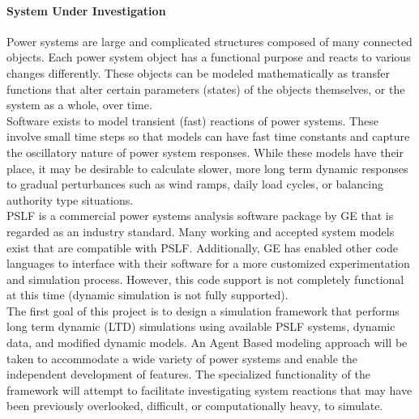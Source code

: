 \documentclass[12pt]{article}
\begin{document}
\paragraph{System Under Investigation}
Power systems are large and complicated structures composed of many connected objects. Each power system object has a functional purpose and reacts to various changes differently. These objects can be modeled mathematically as transfer functions that alter certain parameters (states) of the objects themselves, or the system as a whole, over time. \\

Software exists to model transient (fast) reactions of power systems. These involve small time steps so that models can have fast time constants and capture the oscillatory nature of power system responses. While these models have their place, it may be desirable to calculate slower, more long term dynamic responses to gradual perturbances such as wind ramps, daily load cycles, or balancing authority type situations. \\

PSLF is a commercial power systems analysis software package by GE that is regarded as an industry standard. Many working and accepted system models exist that are compatible with PSLF. Additionally, GE has enabled other code languages to interface with their software for a more customized experimentation and simulation process. However, this code support is not completely functional at this time (dynamic simulation is not fully supported).\\ %

The first goal of this project is to design a simulation framework that performs long term dynamic (LTD) simulations using available PSLF systems, dynamic data, and modified dynamic models. An Agent Based modeling approach will be taken to accommodate a wide variety of power systems and enable the independent development of features. 
The specialized functionality of the framework will attempt to facilitate investigating system reactions that may have been previously overlooked, difficult, or computationally heavy, to simulate.   \\
\end{document}
